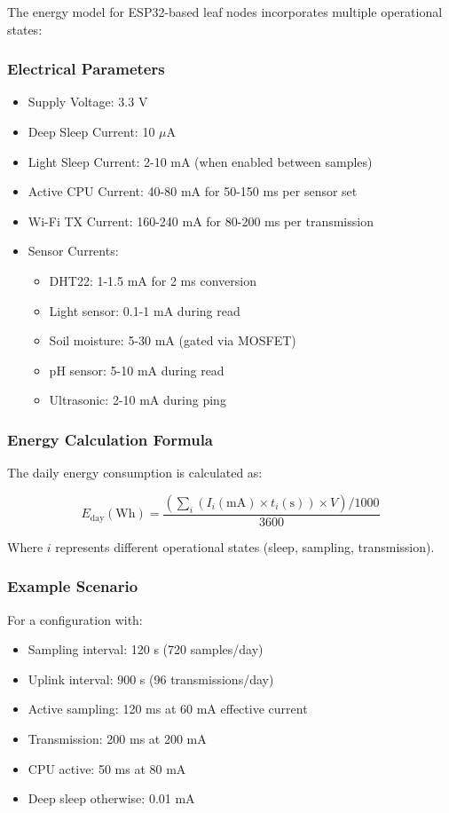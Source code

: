 \documentclass[12pt]{article}
\begin{document}
The energy model for ESP32-based leaf nodes incorporates multiple operational states:

\subsubsection{Electrical Parameters}
\begin{itemize}
    \item Supply Voltage: 3.3 V
    \item Deep Sleep Current: 10 $\mu$A
    \item Light Sleep Current: 2-10 mA (when enabled between samples)
    \item Active CPU Current: 40-80 mA for 50-150 ms per sensor set
    \item Wi-Fi TX Current: 160-240 mA for 80-200 ms per transmission
    \item Sensor Currents:
    \begin{itemize}
        \item DHT22: 1-1.5 mA for 2 ms conversion
        \item Light sensor: 0.1-1 mA during read
        \item Soil moisture: 5-30 mA (gated via MOSFET)
        \item pH sensor: 5-10 mA during read
        \item Ultrasonic: 2-10 mA during ping
    \end{itemize}
\end{itemize}

\subsubsection{Energy Calculation Formula}
The daily energy consumption is calculated as:

\begin{equation}
E_{\text{day}} (\text{Wh}) = \frac{\left( \sum_i (I_i (\text{mA}) \times t_i (\text{s}) ) \times V \right) / 1000}{3600}
\end{equation}

Where $i$ represents different operational states (sleep, sampling, transmission).

\subsubsection{Example Scenario}
For a configuration with:
\begin{itemize}
    \item Sampling interval: 120 s (720 samples/day)
    \item Uplink interval: 900 s (96 transmissions/day)
    \item Active sampling: 120 ms at 60 mA effective current
    \item Transmission: 200 ms at 200 mA
    \item CPU active: 50 ms at 80 mA
    \item Deep sleep otherwise: 0.01 mA
\end{itemize}
\end{document}
